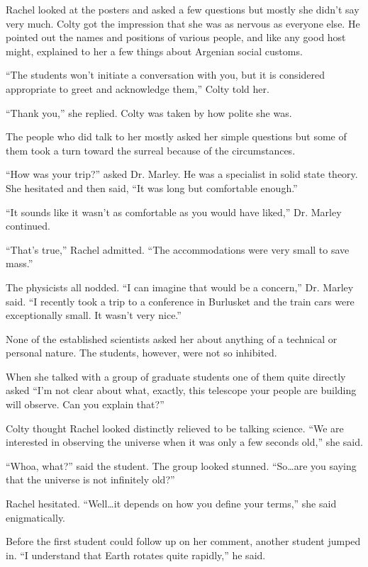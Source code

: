 Rachel looked at the posters and asked a few questions but mostly she didn't say very much.
Colty got the impression that she was as nervous as everyone else. He pointed out the names and
positions of various people, and like any good host might, explained to her a few things about
Argenian social customs.

``The students won't initiate a conversation with you, but it is considered appropriate to
greet and acknowledge them,'' Colty told her.

``Thank you,'' she replied. Colty was taken by how polite she was.

The people who did talk to her mostly asked her simple questions but some of them took a turn
toward the surreal because of the circumstances.

``How was your trip?'' asked Dr. Marley. He was a specialist in solid state theory. She
hesitated and then said, ``It was long but comfortable enough.''

``It sounds like it wasn't as comfortable as you would have liked,'' Dr. Marley continued.

``That's true,'' Rachel admitted. ``The accommodations were very small to save mass.''

The physicists all nodded. ``I can imagine that would be a concern,'' Dr. Marley said. ``I
recently took a trip to a conference in Burlusket and the train cars were exceptionally small.
It wasn't very nice.''

None of the established scientists asked her about anything of a technical or personal nature.
The students, however, were not so inhibited.

When she talked with a group of graduate students one of them quite directly asked ``I'm not
clear about what, exactly, this telescope your people are building will observe. Can you explain
that?''

Colty thought Rachel looked distinctly relieved to be talking science. ``We are interested in
observing the universe when it was only a few seconds old,'' she said.

``Whoa, what?'' said the student. The group looked stunned. ``So\ldots are you saying that
the universe is not infinitely old?''

Rachel hesitated. ``Well\ldots it depends on how you define your terms,'' she said
enigmatically.

Before the first student could follow up on her comment, another student jumped in. ``I
understand that Earth rotates quite rapidly,'' he said.

